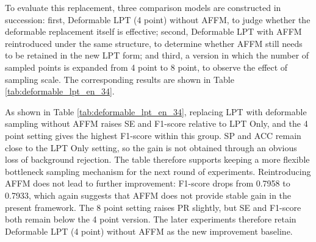 \documentclass[a4paper,11pt]{article}
\begin{document}
To evaluate this replacement, three comparison models are constructed in succession: first, Deformable LPT (4 point) without AFFM, to judge whether the deformable replacement itself is effective; second, Deformable LPT with AFFM reintroduced under the same structure, to determine whether AFFM still needs to be retained in the new LPT form; and third, a version in which the number of sampled points is expanded from 4 point to 8 point, to observe the effect of sampling scale. The corresponding results are shown in Table \ref{tab:deformable_lpt_en_34}.

\begin{table}[!htbp]
\centering
\caption{Results of deformable LPT-related experiments}
\label{tab:deformable_lpt_en_34}
\end{table}

As shown in Table \ref{tab:deformable_lpt_en_34}, replacing LPT with deformable sampling without AFFM raises SE and F1-score relative to LPT Only, and the 4 point setting gives the highest F1-score within this group. SP and ACC remain close to the LPT Only setting, so the gain is not obtained through an obvious loss of background rejection. The table therefore supports keeping a more flexible bottleneck sampling mechanism for the next round of experiments. Reintroducing AFFM does not lead to further improvement: F1-score drops from 0.7958 to 0.7933, which again suggests that AFFM does not provide stable gain in the present framework. The 8 point setting raises PR slightly, but SE and F1-score both remain below the 4 point version. The later experiments therefore retain Deformable LPT (4 point) without AFFM as the new improvement baseline.
\end{document}
